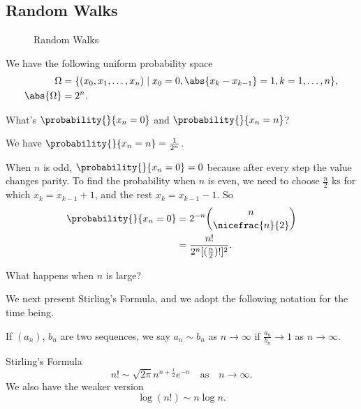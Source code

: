 \subsection{Random Walks}
\begin{figure}[htpb]
    \begin{subfigure}{0.48\textwidth}
    \centering
    \end{subfigure}
    \begin{subfigure}{0.48\textwidth}
    \centering
    \end{subfigure}
    \caption{Random Walks}
    \label{fig:rand}
\end{figure}
We have the following uniform probability space
\begin{align*}
    \Omega &= \{(x_0, x_1, \ldots ,x_n) \mid x_0 = 0, \abs{x_k - x_{k-1}} = 1, k = 1, \ldots, n\},\\
    \abs{\Omega} &= 2^n.
\end{align*}
\begin{problem}
    What's \(\probability{}{x_n = 0}\) and \(\probability{}{x_n = n} \)?
\end{problem}
We have \(\probability{}{x_n = n} = \frac{1}{2^n}\).

When \(n\) is odd, \(\probability{}{x_n = 0} = 0\) because after every step the value changes parity. To find the probability when \(n\) is even, we need to choose \(\frac{n}{2}\) ks for which \(x_k = x_{k-1} + 1\), and the rest \(x_k = x_{k-1}-1\). So
\begin{align*}
    \probability{}{x_n=0} &= 2^{-n}\binom{n}{\nicefrac{n}{2}}\\
    &= \frac{n!}{2^n[(\frac{n}{2})!]^2}.
\end{align*}
\begin{problem}
    What happens when \(n\) is large?
\end{problem}
We next present Stirling's Formula, and we adopt the following notation for the time being.
\begin{notation}
    If \((a_n)\), \(b_n\) are two sequences, we say \(a_{n} \sim b_n \) as \(n \to \infty\) if \(\frac{a_n}{b_n}\to 1\) as \(n \to \infty\).
\end{notation}
\begin{theorem}{Stirling's Formula}{}
    \leavevmode
    \[
        n! \sim \sqrt{2\pi} n^{n+\frac{1}{2}}e^{-n} \quad \text{as}\quad n \to \infty.
    \]
    We also have the weaker version
    \[
        \log(n!)\sim n\log n.
    \]
\end{theorem}